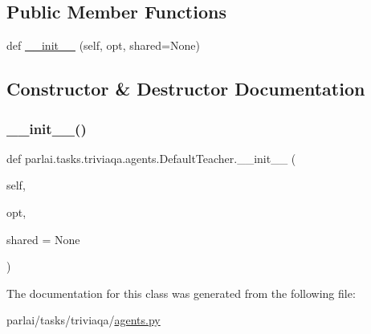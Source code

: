 \subsection*{Public Member Functions}
\begin{DoxyCompactItemize}
\item 
def \hyperlink{classparlai_1_1tasks_1_1triviaqa_1_1agents_1_1DefaultTeacher_aab891504cebc2c749a658d8102d8fbce}{\+\_\+\+\_\+init\+\_\+\+\_\+} (self, opt, shared=None)
\end{DoxyCompactItemize}


\subsection{Constructor \& Destructor Documentation}
\mbox{\label{classparlai_1_1tasks_1_1triviaqa_1_1agents_1_1DefaultTeacher_aab891504cebc2c749a658d8102d8fbce}} 
\subsubsection{\texorpdfstring{\+\_\+\+\_\+init\+\_\+\+\_\+()}{\_\_init\_\_()}}
{\footnotesize\ttfamily def parlai.\+tasks.\+triviaqa.\+agents.\+Default\+Teacher.\+\_\+\+\_\+init\+\_\+\+\_\+ (\begin{DoxyParamCaption}\item[{}]{self,  }\item[{}]{opt,  }\item[{}]{shared = {\ttfamily None} }\end{DoxyParamCaption})}



The documentation for this class was generated from the following file\+:\begin{DoxyCompactItemize}
\item 
parlai/tasks/triviaqa/\hyperlink{parlai_2tasks_2triviaqa_2agents_8py}{agents.\+py}\end{DoxyCompactItemize}

